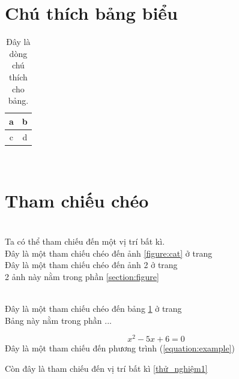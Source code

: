 \documentclass{article}
\begin{document}
\section{Chú thích bảng biểu}
\label{section:table}
\begin{table}[h]
\center
  \begin{tabular}{| c | c |}
	\hline
	a & b \\ \hline
	c & d \\
	\hline
  \end{tabular}
\caption{Đây là dòng chú thích cho bảng.}
\label{table:abcd}
\end{table}

\hfill\\

\section{Tham chiếu chéo}

\hfill\\
\label{thử_nghiệm1}
Ta có thể tham chiếu đến một vị trí bất kì.
\hfill\\
Đây là một tham chiếu chéo đến ảnh \ref{figure:cat} ở trang \\
Đây là một tham chiếu chéo đến ảnh 2 ở trang \pageref{figure:cat_reversed}\\
2 ảnh này nằm trong phần \ref{section:figure}

\hfill\\
Đây là một tham chiếu chéo đến bảng \ref{table:abcd} ở trang \pageref{table:abcd}\\
Bảng này nằm trong phần ...

\begin{equation} \label{equation:example}
x^2 - 5 x + 6 = 0
\end{equation}
Đây là một tham chiếu đến phương trình (\ref{equation:example}) %

Còn đây là tham chiếu đến vị trí bất kì \ref{thử_nghiệm1}
\end{document}
